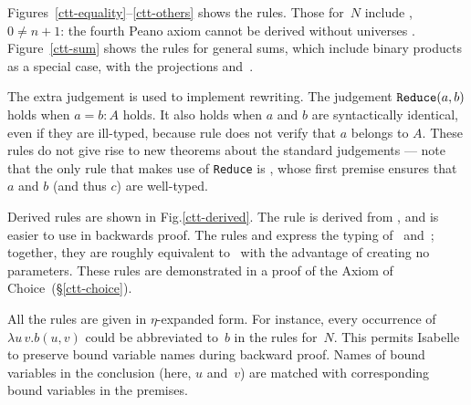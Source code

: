 Figures~\ref{ctt-equality}--\ref{ctt-others} shows the rules.  Those
for~$N$ include , $0\not=n+1$: the fourth Peano axiom
cannot be derived without universes \cite[page 91]{martinlof84}.
Figure~\ref{ctt-sum} shows the rules for general sums, which include binary
products as a special case, with the projections 
and~.

The extra judgement  is used to implement rewriting.  The
judgement ${\tt Reduce}(a,b)$ holds when $a=b:A$ holds.  It also holds
when $a$ and $b$ are syntactically identical, even if they are ill-typed,
because rule  does not verify that $a$ belongs to $A$.  These
rules do not give rise to new theorems about the standard judgements ---
note that the only rule that makes use of {\tt Reduce} is ,
whose first premise ensures that $a$ and $b$ (and thus $c$) are well-typed.

Derived rules are shown in Fig.\ts\ref{ctt-derived}.  The rule
 is derived from , and is easier to
use in backwards proof.  The rules  and
 express the typing of~ and~;
together, they are roughly equivalent to~ with the advantage
of creating no parameters.  These rules are demonstrated in a proof of the
Axiom of Choice~(\S\ref{ctt-choice}).

All the rules are given in $\eta$-expanded form.  For instance, every
occurrence of $\lambda u\,v.b(u,v)$ could be abbreviated to~$b$ in the
rules for~$N$.  This permits Isabelle to preserve bound variable names
during backward proof.  Names of bound variables in the conclusion (here,
$u$ and~$v$) are matched with corresponding bound variables in the premises.


